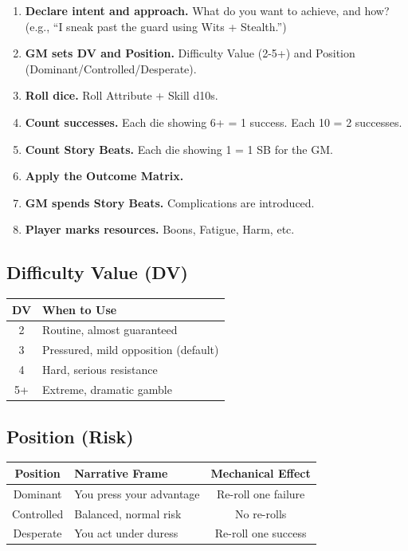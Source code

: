 \documentclass[10pt]{article}
\begin{document}
\begin{enumerate}
\item \textbf{Declare intent and approach.} What do you want to achieve, and how? (e.g., ``I sneak past the guard using Wits + Stealth.'')
\item \textbf{GM sets DV and Position.} Difficulty Value (2-5+) and Position (Dominant/Controlled/Desperate).
\item \textbf{Roll dice.} Roll Attribute + Skill d10s.
\item \textbf{Count successes.} Each die showing 6+ = 1 success. Each 10 = 2 successes.
\item \textbf{Count Story Beats.} Each die showing 1 = 1 SB for the GM.
\item \textbf{Apply the Outcome Matrix.}
\item \textbf{GM spends Story Beats.} Complications are introduced.
\item \textbf{Player marks resources.} Boons, Fatigue, Harm, etc.
\end{enumerate}

\subsection*{Difficulty Value (DV)}

\begin{center}
\begin{tabular}{|c|l|}
\hline
\textbf{DV} & \textbf{When to Use} \\
\hline
2 & Routine, almost guaranteed \\
3 & Pressured, mild opposition (default) \\
4 & Hard, serious resistance \\
5+ & Extreme, dramatic gamble \\
\hline
\end{tabular}
\end{center}

\subsection*{Position (Risk)}

\begin{center}
\begin{tabular}{|c|l|c|}
\hline
\textbf{Position} & \textbf{Narrative Frame} & \textbf{Mechanical Effect} \\
\hline
Dominant & You press your advantage & Re-roll one failure \\
Controlled & Balanced, normal risk & No re-rolls \\
Desperate & You act under duress & Re-roll one success \\
\hline
\end{tabular}
\end{center}
\end{document}
